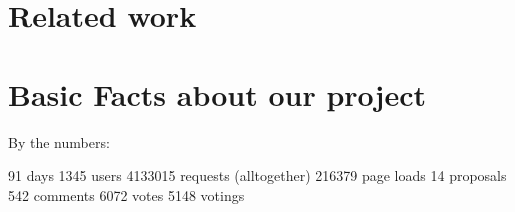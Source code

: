 



\section{Related work}

\section{Basic Facts about our project}

By the numbers:

91 days
1345 users
4133015 requests (alltogether)
216379 page loads
14 proposals
542 comments
6072 votes
5148 votings


